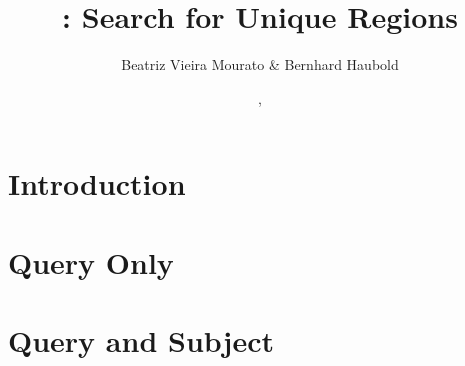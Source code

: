\documentclass[a4paper]{report}
\begin{document}
\pagestyle{noweb}

\title{: Search for Unique Regions}
\author{Beatriz Vieira Mourato \& Bernhard Haubold}
\date{\!\!, }
\maketitle

\tableofcontents

\chapter{Introduction}

\chapter{Query Only}


\chapter{Query and Subject}




\end{document}
